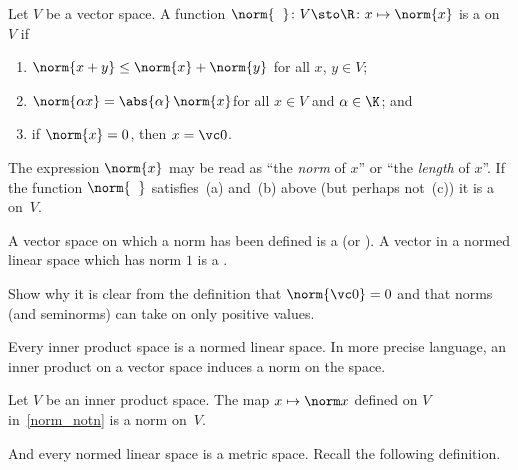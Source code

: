 \begin{defn} Let $V$ be a vector space. A function
$\norm{\hphantom{x}} \colon V \sto \R \colon x \mapsto \norm{x}$ is a
 on $V$ if
 \begin{enumerate}
  \item $\norm{x + y} \le \norm{x} + \norm{y}$ \qquad  for all $x$, $y \in V$;
  \item $\norm{\alpha x} = \abs{\alpha}\,\norm{x}$\qquad for all $x \in V$ and
$\alpha \in \K$; and
  \item if $\norm{x} = 0$, then $x = \vc 0$.
 \end{enumerate}
The expression $\norm{x}$ may be read as ``the \emph{norm} of $x$'' or ``the
\emph{length} of $x$''.  If the function $\norm{\hphantom{x}}$ satisfies~(a) and~(b)
above (but perhaps not~(c)) it is a
 on~$V$.

A vector space on which a norm has been defined is a
 (or
). A vector in a normed linear space which has norm $1$ is a
.
\end{defn}

\begin{exer} Show why it is clear from the definition that $\norm{\vc 0} = 0$ and that norms
(and seminorms) can take on only positive values.
\end{exer}

Every inner product space is a normed linear space.  In more precise language, an inner product on a vector space induces
a norm on the space.

\begin{prop}\label{00015025} Let $V$ be an inner product space. The map $x \mapsto \norm
x$ defined on $V$ in~\ref{norm_notn} is a norm on~$V$.
\end{prop}

And every normed linear space is a metric space.  Recall the following definition.

